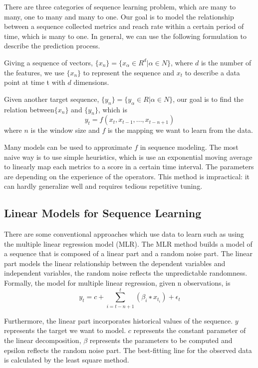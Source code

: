 \documentclass[5p]{elsarticle}
\newcommand{\dabiaolv}{reach rate }
\begin{document}
There are three categories of sequence learning problem, which are many to many, one to many and many to one. Our goal is to model the relationship between a sequence collected metrics and \dabiaolv within a certain period of time, which is many to one. In general, we can use the following formulation to describe the prediction process.

Giving a sequence of vectors, $\{x_n\}=\{x_{\alpha} \in R^{d}|\alpha \in N\}$, where $d$ is the number of the features, we use $\{x_n\}$ to represent the sequence and $x_t$ to describe a data point at time t with $d$ dimensions.

Given another target sequence, $\{y_n\}=\{y_{\alpha} \in R|\alpha \in N\}$, our goal is to find the relation between$\{x_n\}$ and $\{y_n\}$, which is 
$$y_t=f(x_{t},x_{t-1},...,x_{t-n+1})$$
where $n$ is the window size and $f$ is the mapping we want to learn from the data.

Many models can be used to approximate $f$ in sequence modeling. The most naive way is to use simple heuristics, which is use an exponential moving average to linearly map each metrics to a score in a certain time interval. The parameters are depending on the experience of the operators. This method is impractical: it can hardly generalize well and requires tedious repetitive tuning.

\subsection{Linear Models for Sequence Learning}

There are some conventional approaches which use data to learn such as using the multiple linear regression model (MLR). The MLR method builds a model of a sequence that is composed of a linear part and a random noise part. The linear part models the linear relationship between the dependent variables and independent variables, the random noise reflects the unpredictable randomness. Formally, the model for multiple linear regression, given n observations, is 
    $$y_t = c+\sum_{i=t-n+1}^{t}(\beta_i ∗ x_{t_i})+\epsilon_t$$

Furthermore, the linear part incorporates historical values of the sequence. $y$ represents the target we want to model. $c$ represents the constant parameter of the linear decomposition, $\beta$ represents the parameters to be computed and epsilon reflects the random noise part. The best-fitting line for the observed data is calculated by the least square method.
\end{document}
